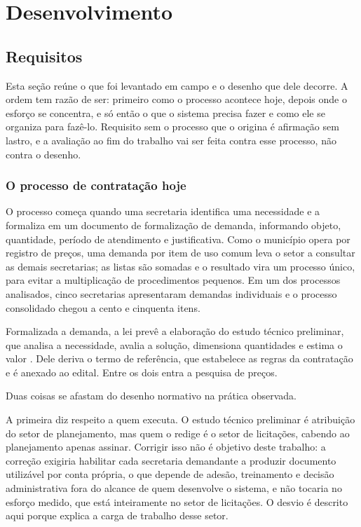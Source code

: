 \section{Desenvolvimento}
\label{sec:requisitos-arquitetura}

\subsection{Requisitos}
\label{subsec:bloco-requisitos}

Esta seção reúne o que foi levantado em campo e o desenho que dele decorre. A
ordem tem razão de ser: primeiro como o processo acontece hoje, depois onde o esforço
se concentra, e só então o que o sistema precisa fazer e como ele se organiza
para fazê-lo. Requisito sem o processo que o origina é afirmação sem lastro, e a
avaliação ao fim do trabalho vai ser feita contra esse processo, não contra o
desenho.

\subsubsection{O processo de contratação hoje}
\label{subsec:processo-hoje}

O processo começa quando uma secretaria identifica uma necessidade e a formaliza
em um documento de formalização de demanda, informando objeto, quantidade,
período de atendimento e justificativa. Como o município opera por registro de
preços, uma demanda por item de uso comum leva o setor a consultar as demais
secretarias; as listas são somadas e o resultado vira um processo único, para
evitar a multiplicação de procedimentos pequenos. Em um dos processos
analisados, cinco secretarias apresentaram demandas individuais e o processo
consolidado chegou a cento e cinquenta itens.

Formalizada a demanda, a lei prevê a elaboração do estudo técnico preliminar,
que analisa a necessidade, avalia a solução, dimensiona quantidades e estima o
valor \cite{brasil2021lei14133}. Dele deriva o termo de referência, que
estabelece as regras da contratação e é anexado ao edital. Entre os dois entra a
pesquisa de preços.

Duas coisas se afastam do desenho normativo na prática observada.

A primeira diz respeito a quem executa. O estudo técnico preliminar é atribuição
do setor de planejamento, mas quem o redige é o setor de licitações, cabendo ao
planejamento apenas assinar. Corrigir isso não é objetivo deste trabalho: a
correção exigiria habilitar cada secretaria demandante a produzir documento
utilizável por conta própria, o que depende de adesão, treinamento e decisão
administrativa fora do alcance de quem desenvolve o sistema, e não tocaria no
esforço medido, que está inteiramente no setor de licitações. O desvio é
descrito aqui porque explica a carga de trabalho desse setor.

